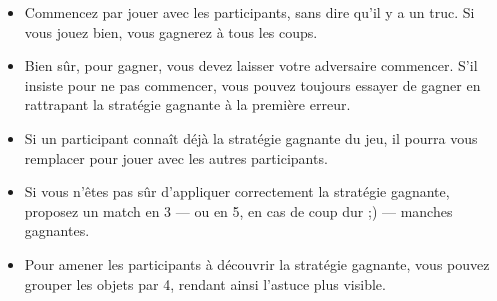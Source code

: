 \begin{itemize}
\item Commencez par jouer avec les participants, sans dire qu'il y a un truc. Si
  vous jouez bien, vous gagnerez à tous les coups.
\item Bien sûr, pour gagner, vous devez laisser votre adversaire commencer.
  S'il insiste pour ne pas commencer, vous pouvez toujours essayer de gagner en
  rattrapant la stratégie gagnante à la première erreur.
\item Si un participant connaît déjà la stratégie gagnante du jeu, il pourra
  vous remplacer pour jouer avec les autres participants.
\item Si vous n'êtes pas sûr d'appliquer correctement la stratégie gagnante,
  proposez un match en 3 --- ou en 5, en cas de coup dur ;) --- manches
  gagnantes.
\item Pour amener les participants à découvrir la stratégie gagnante, vous
  pouvez grouper les objets par 4, rendant ainsi l'astuce plus visible.
\end{itemize}


